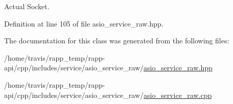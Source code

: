 Actual Socket. 



Definition at line 105 of file asio\-\_\-service\-\_\-raw.\-hpp.



The documentation for this class was generated from the following files\-:\begin{DoxyCompactItemize}
\item 
/home/travis/rapp\-\_\-temp/rapp-\/api/cpp/includes/service/asio\-\_\-service\-\_\-raw/\hyperlink{asio__service__raw_8hpp}{asio\-\_\-service\-\_\-raw.\-hpp}\item 
/home/travis/rapp\-\_\-temp/rapp-\/api/cpp/includes/service/asio\-\_\-service\-\_\-raw/\hyperlink{asio__service__raw_8cpp}{asio\-\_\-service\-\_\-raw.\-cpp}\end{DoxyCompactItemize}
